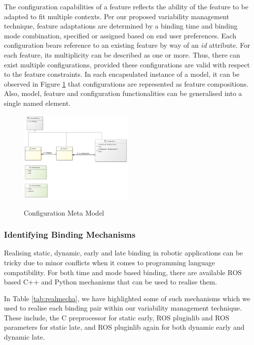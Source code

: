 \documentclass[conference]{IEEEtran}
\begin{document}
The configuration capabilities of a feature reflects the ability of the feature to be adapted to fit multiple contexts. Per our proposed variability management technique,
feature adaptations are determined by a binding time and binding mode combination, specified or assigned based on end user preferences. Each configuration bears reference to an existing feature by way of an \textit{id} attribute. For each feature, its multiplicity can be described as one or more. Thus, there can exist multiple configurations, provided these configurations are valid with respect to the feature constraints. In each encapsulated instance of a model, it can be observed in Figure \ref{conmet} that configurations are represented as feature compositions. Also, model, feature and configuration functionalities can be generalised into a single named element. 

\begin{figure}[H]
\caption{Configuration Meta Model}
\centering
\includegraphics[width=0.5\textwidth]{diagrams/config.png}
\label{conmet}
\end{figure}

\subsubsection{Identifying Binding Mechanisms}
Realising static, dynamic, early and late binding in robotic applications can be tricky due to minor conflicts when it comes to programming language compatibility. For both time and mode based binding, there are available ROS based C++ and Python mechanisms that can be used to realise them.

In Table \ref{tab:realmecha}, we have highlighted some of such mechanisms which we used to realise each binding pair within our variability management technique. These include, the C preprocessor for static early, ROS pluginlib and ROS parameters for static late, and ROS pluginlib again for both dynamic early and dynamic late.
\end{document}
